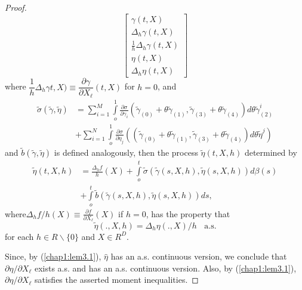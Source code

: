 \begin{proof}
\begin{equation*}
\begin{bmatrix}
\gamma(t,X)\\ 
\Delta_h \gamma (t,X)\\ 
\frac{1}{h}\Delta_h \gamma (t,X) \\ 
\eta (t,X) \\ 
\Delta _h \eta (t,X) 
\end{bmatrix}
\end{equation*}
where $\dfrac{1}{h}\Delta_h \gamma t,X) \equiv \dfrac{\partial
  \gamma}{\partial X_\ell} (t,X)$ for $h=0$, and 
\begin{align*}
\tilde{\sigma} (\tilde{\gamma},\tilde{\eta}) &=\sum^{M}_{i=1}\int
\limits^1_o \frac{\partial \sigma}{\partial \gamma_i} (\tilde
       {\gamma}_{(0)} + \theta \tilde{\gamma}_{(1)},\tilde
       {\gamma}_{(3)}+ \theta \tilde{\gamma}_{(4)})d \theta \tilde
       {\gamma}^i_{(2)}\\ 
       &+ \sum^{N}_{i=1}\int\limits^1_o \frac{\partial
         \hat{\sigma}}{\partial \eta_j}((\tilde{\gamma}_{(0)} +
       \theta \tilde{\gamma}_{(1)},\tilde{\gamma}_{(3)} + \theta
       \tilde{\gamma}_{(4)})d \theta \tilde {\eta}^j)  
\end{align*}
and $\tilde{b}(\tilde{\gamma},\tilde{\eta})$ is defined analogously,
then the process $\tilde{\eta}(t,X,h)$ determined by 
\begin{align*}
\tilde{\eta}(t,X,h) &= \frac{\Delta_h f}{h}(X) + \int \limits ^t _o
\tilde{\sigma}(\tilde{\gamma}(s,X,h), \tilde{\eta}(s,X,h))d \beta
(s)\\ 
&+ \int \limits ^t _o \tilde{b}(\tilde{\gamma}(s,X,h),
\tilde{\eta}(s,X,h))ds,
\end{align*}
where\pageoriginale $\Delta_h f /h (X) \equiv \frac{\partial f}{\partial
  X_\ell} (X)$ if  $h=0$, has the property that 
$$
\tilde{\eta}(.,X,h)=\Delta_h \eta(.,X)/h \; \; \text{ a.s.} 
$$
for each $h \in R \backslash \{0\}$ and $X \in R^D$. 
 
Since, by (\ref{chap1:lem3.1}), $\hat{\eta}$ has an a.s. continuous version, we
conclude that $\partial \eta/\partial X_{\ell}$ exists a.s. and has an a.s.
continuous version. Also, by (\ref{chap1:lem3.1}), $\partial \eta /
\partial X_ \ell$ 
satisfies the asserted moment inequalities.  
\end{proof}

